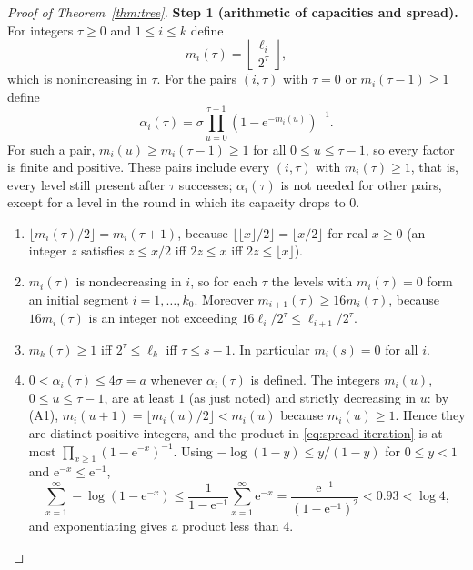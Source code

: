 \documentclass[11pt]{article}
\numberwithin{equation}{section}
\newcommand{\ee}{\mathrm e}
\newcommand{\step}[2]{\par\medskip\noindent\textbf{Step #1 (#2).}\ }
\begin{document}
\begin{proof}[Proof of Theorem~\ref{thm:tree}]
\step{1}{arithmetic of capacities and spread}
For integers $\tau\ge0$ and $1\le i\le k$ define
\begin{equation}\label{eq:capacities}
 m_i(\tau)=\left\lfloor\frac{\ell_i}{2^\tau}\right\rfloor,
\end{equation}
which is nonincreasing in $\tau$. For the pairs $(i,\tau)$ with
$\tau=0$ or $m_i(\tau-1)\ge1$ define
\begin{equation}\label{eq:spread-iteration}
 \alpha_i(\tau)=\sigma
 \prod_{u=0}^{\tau-1}
 \left(1-\ee^{-m_i(u)}\right)^{-1}.
\end{equation}
For such a pair, $m_i(u)\ge m_i(\tau-1)\ge1$ for all $0\le u\le\tau-1$,
so every factor is finite and positive. These pairs include every
$(i,\tau)$ with $m_i(\tau)\ge1$, that is, every level still present
after $\tau$ successes; $\alpha_i(\tau)$ is not needed for other pairs,
except for a level in the round in which its capacity drops to $0$.
\begin{enumerate}[label=(A\arabic*),leftmargin=2.8em,itemsep=2pt]
 \item $\lfloor m_i(\tau)/2\rfloor=m_i(\tau+1)$, because
 $\lfloor\lfloor x\rfloor/2\rfloor=\lfloor x/2\rfloor$ for real
 $x\ge0$ (an integer $z$ satisfies $z\le x/2$ iff $2z\le x$ iff
 $2z\le\lfloor x\rfloor$).
 \item $m_i(\tau)$ is nondecreasing in $i$, so for each $\tau$ the
 levels with $m_i(\tau)=0$ form an initial segment
 $i=1,\ldots,k_0$. Moreover $m_{i+1}(\tau)\ge16m_i(\tau)$, because
 $16m_i(\tau)$ is an integer not exceeding
 $16\ell_i/2^\tau\le\ell_{i+1}/2^\tau$.
 \item $m_k(\tau)\ge1$ iff $2^\tau\le\ell_k$ iff $\tau\le s-1$. In
 particular $m_i(s)=0$ for all $i$.
 \item $0<\alpha_i(\tau)\le4\sigma=a$ whenever $\alpha_i(\tau)$ is
 defined. The integers $m_i(u)$, $0\le u\le\tau-1$, are at least $1$
 (as just noted) and strictly decreasing in $u$: by (A1),
 $m_i(u+1)=\lfloor m_i(u)/2\rfloor<m_i(u)$ because $m_i(u)\ge1$. Hence
 they are distinct positive integers, and the product in
 \eqref{eq:spread-iteration} is at most
 $\prod_{x\ge1}(1-\ee^{-x})^{-1}$. Using
 $-\log(1-y)\le y/(1-y)$ for $0\le y<1$ and $\ee^{-x}\le\ee^{-1}$,
 \begin{equation}\label{eq:product}
 \sum_{x=1}^{\infty}-\log(1-\ee^{-x})
 \le \frac{1}{1-\ee^{-1}}\sum_{x=1}^{\infty}\ee^{-x}
 =\frac{\ee^{-1}}{(1-\ee^{-1})^2}<0.93<\log 4,
 \end{equation}
 and exponentiating gives a product less than $4$.
\end{enumerate}


\end{proof}
\end{document}
